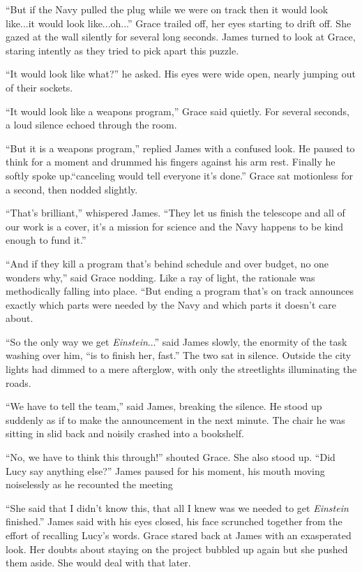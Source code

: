 \documentclass[12pt]{article} %
\begin{document}
``But if the Navy pulled the plug while we were on track then it would look like...it would look like...oh...'' Grace trailed off, her eyes starting to drift off. She gazed at the wall silently for several long seconds. James turned to look at Grace, staring intently as they tried to pick apart this puzzle.

``It would look like what?'' he asked. His eyes were wide open, nearly jumping out of their sockets.

``It would look like a weapons program,'' Grace said quietly. For several seconds, a loud silence echoed through the room.

``But it is a weapons program,'' replied James with a confused look. He paused to think for a moment and drummed his fingers against his arm rest. Finally he softly spoke up.``canceling would tell everyone it's done.'' Grace sat motionless for a second, then nodded slightly.

``That's brilliant,'' whispered James. ``They let us finish the telescope and all of our work is a cover, it's a mission for science and the Navy happens to be kind enough to fund it.''

``And if they kill a program that's behind schedule and over budget, no one wonders why,'' said Grace nodding. Like a ray of light, the rationale was methodically falling into place. ``But ending a program that's on track announces exactly which parts were needed by the Navy and which parts it doesn't care about.

``So the only way we get \textit{Einstein}...'' said James slowly, the enormity of the task washing over him, ``is to finish her, fast.'' The two sat in silence. Outside the city lights had dimmed to a mere afterglow, with only the streetlights illuminating the roads.

``We have to tell the team,'' said James, breaking the silence. He stood up suddenly as if to make the announcement in the next minute. The chair he was sitting in slid back and noisily crashed into a bookshelf.

``No, we have to think this through!'' shouted Grace. She also stood up. ``Did Lucy say anything else?'' James paused for his moment, his mouth moving noiselessly as he recounted the meeting

``She said that I didn't know this, that all I knew was we needed to get \textit{Einstein} finished.'' James said with his eyes closed, his face scrunched together from the effort of recalling Lucy's words. Grace stared back at James with an exasperated look. Her doubts about staying on the project bubbled up again but she pushed them aside. She would deal with that later.
\end{document}
